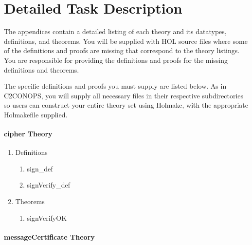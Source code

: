 \documentclass[10pt,twoside]{article}
\begin{document}
\section{Detailed Task Description}
\label{sec:task-description}

The appendices contain a detailed listing of each theory and its
datatypes, definitions, and theorems.  You will be supplied with HOL
source files where some of the definitions and proofs are missing that
correspond to the theory listings.  You are responsible for providing
the definitions and proofs for the missing definitions and theorems.

The specific definitions and proofs you must supply are listed
below. As in C2CONOPS, you will supply all necessary files in their
respective subdirectories so users can construct your entire theory
set using Holmake, with the appropriate Holmakefile supplied.

\paragraph{cipher Theory}

\begin{enumerate}
\item Definitions
  \begin{enumerate}[{a.}]
  \item sign\_def
  \item signVerify\_def
  \end{enumerate}
\item Theorems
  \begin{enumerate}[{a.}]
  \item signVerifyOK
  \end{enumerate}
\end{enumerate}

\paragraph{messageCertificate Theory}
\end{document}
